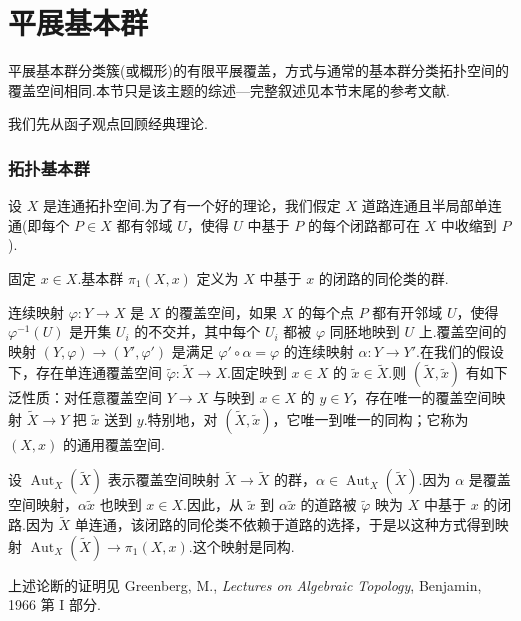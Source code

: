 ﻿%
\chapter{平展基本群}\label{sec:3}

平展基本群分类簇(或概形)的有限平展覆盖，方式与通常的基本群分类拓扑空间的覆盖空间相同.本节只是该主题的综述---完整叙述见本节末尾的参考文献.

我们先从函子观点回顾经典理论.

\subsection*{拓扑基本群}

设 $X$ 是连通拓扑空间.为了有一个好的理论，我们假定 $X$ 道路连通且半局部单连通(即每个 $P \in X$ 都有邻域 $U$，使得 $U$ 中基于 $P$ 的每个闭路都可在 $X$ 中收缩到 $P$).

固定 $x \in X$.基本群 $\pi_1(X, x)$ 定义为 $X$ 中基于 $x$ 的闭路的同伦类的群.

连续映射 $\varphi \colon Y \to X$ 是 $X$ 的覆盖空间，如果 $X$ 的每个点 $P$ 都有开邻域 $U$，使得 $\varphi^{-1}(U)$ 是开集 $U_i$ 的不交并，其中每个 $U_i$ 都被 $\varphi$ 同胚地映到 $U$ 上.覆盖空间的映射 $(Y, \varphi) \to (Y', \varphi')$ 是满足 $\varphi' \circ \alpha = \varphi$ 的连续映射 $\alpha \colon Y \to Y'$.在我们的假设下，存在单连通覆盖空间 $\widetilde{\varphi} \colon \widetilde{X} \to X$.固定映到 $x \in X$ 的 $\tilde{x} \in \widetilde{X}$.则 $(\widetilde{X}, \tilde{x})$ 有如下泛性质：对任意覆盖空间 $Y \to X$ 与映到 $x \in X$ 的 $y \in Y$，存在唯一的覆盖空间映射 $\widetilde{X} \to Y$ 把 $\tilde{x}$ 送到 $y$.特别地，对 $(\widetilde{X}, \tilde{x})$，它唯一到唯一的同构；它称为 $(X, x)$ 的通用覆盖空间.

设 $\operatorname{Aut}_X(\widetilde{X})$ 表示覆盖空间映射 $\widetilde{X} \to \widetilde{X}$ 的群，$\alpha \in \operatorname{Aut}_X(\widetilde{X})$.因为 $\alpha$ 是覆盖空间映射，$\alpha \tilde{x}$ 也映到 $x \in X$.因此，从 $\tilde{x}$ 到 $\alpha \tilde{x}$ 的道路被 $\widetilde{\varphi}$ 映为 $X$ 中基于 $x$ 的闭路.因为 $\widetilde{X}$ 单连通，该闭路的同伦类不依赖于道路的选择，于是以这种方式得到映射 $\operatorname{Aut}_X(\widetilde{X}) \to \pi_1(X, x)$.这个映射是同构.

上述论断的证明见 Greenberg, M., \emph{Lectures on Algebraic Topology}, Benjamin, 1966 第 I 部分.

